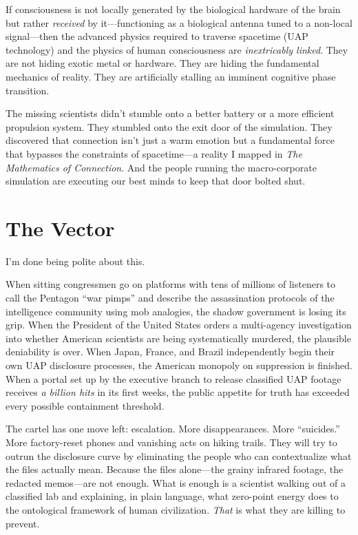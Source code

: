 \documentclass[11pt,a4paper]{article}
\begin{document}
If consciousness is not locally generated by the biological hardware of the brain but rather \textit{received} by it---functioning as a biological antenna tuned to a non-local signal---then the advanced physics required to traverse spacetime (UAP technology) and the physics of human consciousness are \textit{inextricably linked}. They are not hiding exotic metal or hardware. They are hiding the fundamental mechanics of reality. They are artificially stalling an imminent cognitive phase transition.

The missing scientists didn't stumble onto a better battery or a more efficient propulsion system. They stumbled onto the exit door of the simulation. They discovered that connection isn't just a warm emotion but a fundamental force that bypasses the constraints of spacetime---a reality I mapped in \textit{The Mathematics of Connection}. And the people running the macro-corporate simulation are executing our best minds to keep that door bolted shut.

\section{The Vector}

I'm done being polite about this.

When sitting congressmen go on platforms with tens of millions of listeners to call the Pentagon ``war pimps'' and describe the assassination protocols of the intelligence community using mob analogies, the shadow government is losing its grip. When the President of the United States orders a multi-agency investigation into whether American scientists are being systematically murdered, the plausible deniability is over. When Japan, France, and Brazil independently begin their own UAP disclosure processes, the American monopoly on suppression is finished. When a portal set up by the executive branch to release classified UAP footage receives \textit{a billion hits} in its first weeks, the public appetite for truth has exceeded every possible containment threshold.

The cartel has one move left: escalation. More disappearances. More ``suicides.'' More factory-reset phones and vanishing acts on hiking trails. They will try to outrun the disclosure curve by eliminating the people who can contextualize what the files actually mean. Because the files alone---the grainy infrared footage, the redacted memos---are not enough. What is enough is a scientist walking out of a classified lab and explaining, in plain language, what zero-point energy does to the ontological framework of human civilization. \textit{That} is what they are killing to prevent.
\end{document}
